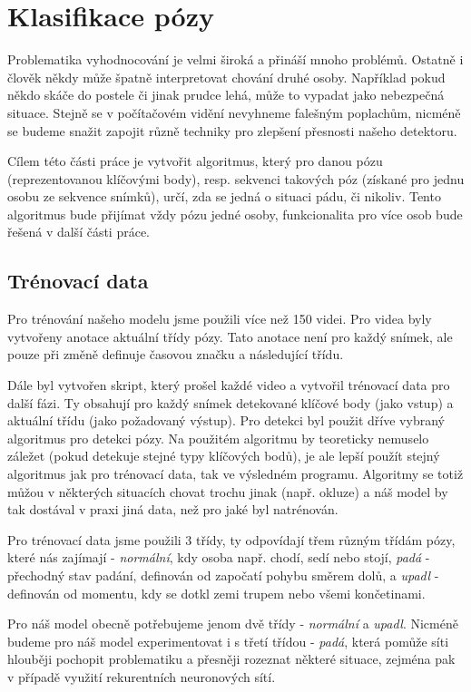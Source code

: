 \chapter{Klasifikace pózy}
\label{sec:PoseClassification}

Problematika vyhodnocování je velmi široká a přináší mnoho problémů. Ostatně i
člověk někdy může špatně interpretovat chování druhé osoby. Například pokud
někdo skáče do postele či jinak prudce lehá, může to vypadat jako nebezpečná
situace. Stejně se v počítačovém vidění nevyhneme falešným poplachům, nicméně
se budeme snažit zapojit různě techniky pro zlepšení přesnosti našeho
detektoru.

Cílem této části práce je vytvořit algoritmus, který pro danou pózu
(reprezentovanou klíčovými body), resp. sekvenci takových póz (získané pro
jednu osobu ze sekvence snímků), určí, zda se jedná o situaci pádu, či nikoliv.
Tento algoritmus bude přijímat vždy pózu jedné osoby, funkcionalita pro více
osob bude řešená v další části práce.

\section{Trénovací data}

Pro trénování našeho modelu jsme použili více než 150 videi. Pro videa byly
vytvořeny anotace aktuální třídy pózy. Tato anotace není pro každý snímek, ale
pouze při změně definuje časovou značku a následující třídu.

Dále byl vytvořen skript, který prošel každé video a vytvořil trénovací data
pro další fázi. Ty obsahují pro každý snímek detekované klíčové body (jako
vstup) a aktuální třídu (jako požadovaný výstup). Pro detekci byl použit dříve
vybraný algoritmus pro detekci pózy. Na použitém algoritmu by teoreticky
nemuselo záležet (pokud detekuje stejné typy klíčových bodů), je ale lepší
použít stejný algoritmus jak pro trénovací data, tak ve výsledném programu.
Algoritmy se totiž můžou v některých situacích chovat trochu jinak (např.
okluze) a náš model by tak dostával v praxi jiná data, než pro jaké byl
natrénován.

Pro trénovací data jsme použili 3 třídy, ty odpovídají třem různým třídám pózy,
které nás zajímají - \textit{normální}, kdy osoba např. chodí, sedí nebo stojí,
\textit{padá} - přechodný stav padání, definován od započatí pohybu směrem
dolů, a \textit{upadl} - definován od momentu, kdy se dotkl zemi trupem nebo
všemi končetinami.

Pro náš model obecně potřebujeme jenom dvě třídy - \textit{normální} a
\textit{upadl}. Nicméně budeme pro náš model experimentovat i s třetí třídou -
\textit{padá}, která pomůže síti hlouběji pochopit problematiku a přesněji
rozeznat některé situace, zejména pak v případě využití rekurentních
neuronových sítí.

